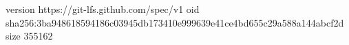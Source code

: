 version https://git-lfs.github.com/spec/v1
oid sha256:3ba948618594186c03945db173410e999639e41ce4bd655c29a588a144abcf2d
size 355162
